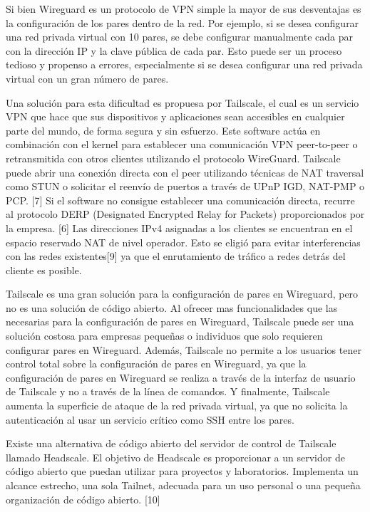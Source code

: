 \documentclass[letterpaper,12pt,oneside]{book}
\begin{document}
Si bien Wireguard es un protocolo de VPN simple la mayor de sus desventajas es la configuración de los pares dentro de la red. Por ejemplo, si se desea configurar una red privada virtual con 10 pares, se debe configurar manualmente cada par con la dirección IP y la clave pública de cada par. Esto puede ser un proceso tedioso y propenso a errores, especialmente si se desea configurar una red privada virtual con un gran número de pares.

Una solución para esta dificultad es propuesa por Tailscale, el cual es un servicio VPN que hace que sus dispositivos y aplicaciones sean accesibles en cualquier parte del mundo, de forma segura y sin esfuerzo. Este software actúa en combinación con el kernel para establecer una comunicación VPN peer-to-peer o retransmitida con otros clientes utilizando el protocolo WireGuard. Tailscale puede abrir una conexión directa con el peer utilizando técnicas de NAT traversal como STUN o solicitar el reenvío de puertos a través de UPnP IGD, NAT-PMP o PCP. [7] Si el software no consigue establecer una comunicación directa, recurre al protocolo DERP (Designated Encrypted Relay for Packets) proporcionados por la empresa. [6] Las direcciones IPv4 asignadas a los clientes se encuentran en el espacio reservado NAT de nivel operador. Esto se eligió para evitar interferencias con las redes existentes[9] ya que el enrutamiento de tráfico a redes detrás del cliente es posible.

Tailscale es una gran solución para la configuración de pares en Wireguard, pero no es una solución de código abierto. Al ofrecer mas funcionalidades que las necesarias para la configuración de pares en Wireguard, Tailscale puede ser una solución costosa para empresas pequeñas o individuos que solo requieren configurar pares en Wireguard. Además, Tailscale no permite a los usuarios tener control total sobre la configuración de pares en Wireguard, ya que la configuración de pares en Wireguard se realiza a través de la interfaz de usuario de Tailscale y no a través de la línea de comandos. Y finalmente, Tailscale aumenta la superficie de ataque de la red privada virtual, ya que no solicita la autenticación al usar un servicio crítico como SSH entre los pares.

Existe una alternativa de código abierto del servidor de control de Tailscale llamado Headscale. El objetivo de Headscale es proporcionar a un servidor de código abierto que puedan utilizar para proyectos y laboratorios. Implementa un alcance estrecho, una sola Tailnet, adecuada para un uso personal o una pequeña organización de código abierto. [10]
\end{document}

